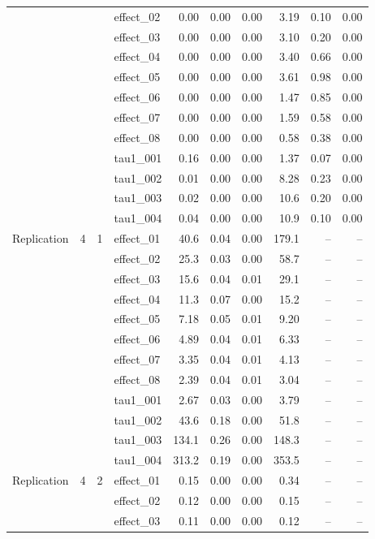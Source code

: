 {\begin{longtable}{lccl rr r r rr}
 &  &  & effect\_02 & 0.00 & 0.00 & 0.00 & 3.19 & 0.10 & 0.00\\
 &  &  & effect\_03 & 0.00 & 0.00 & 0.00 & 3.10 & 0.20 & 0.00\\
 &  &  & effect\_04 & 0.00 & 0.00 & 0.00 & 3.40 & 0.66 & 0.00\\
 &  &  & effect\_05 & 0.00 & 0.00 & 0.00 & 3.61 & 0.98 & 0.00\\
 &  &  & effect\_06 & 0.00 & 0.00 & 0.00 & 1.47 & 0.85 & 0.00\\
 &  &  & effect\_07 & 0.00 & 0.00 & 0.00 & 1.59 & 0.58 & 0.00\\
 &  &  & effect\_08 & 0.00 & 0.00 & 0.00 & 0.58 & 0.38 & 0.00\\
 &  &  & tau1\_001 & 0.16 & 0.00 & 0.00 & 1.37 & 0.07 & 0.00\\
 &  &  & tau1\_002 & 0.01 & 0.00 & 0.00 & 8.28 & 0.23 & 0.00\\
 &  &  & tau1\_003 & 0.02 & 0.00 & 0.00 & 10.6 & 0.20 & 0.00\\
 &  &  & tau1\_004 & 0.04 & 0.00 & 0.00 & 10.9 & 0.10 & 0.00\\
\midrule
Replication & 4 & 1 & effect\_01 & 40.6 & 0.04 & 0.00 & 179.1 & -- & --\\
 &  &  & effect\_02 & 25.3 & 0.03 & 0.00 & 58.7 & -- & --\\
 &  &  & effect\_03 & 15.6 & 0.04 & 0.01 & 29.1 & -- & --\\
 &  &  & effect\_04 & 11.3 & 0.07 & 0.00 & 15.2 & -- & --\\
 &  &  & effect\_05 & 7.18 & 0.05 & 0.01 & 9.20 & -- & --\\
 &  &  & effect\_06 & 4.89 & 0.04 & 0.01 & 6.33 & -- & --\\
 &  &  & effect\_07 & 3.35 & 0.04 & 0.01 & 4.13 & -- & --\\
 &  &  & effect\_08 & 2.39 & 0.04 & 0.01 & 3.04 & -- & --\\
 &  &  & tau1\_001 & 2.67 & 0.03 & 0.00 & 3.79 & -- & --\\
 &  &  & tau1\_002 & 43.6 & 0.18 & 0.00 & 51.8 & -- & --\\
 &  &  & tau1\_003 & 134.1 & 0.26 & 0.00 & 148.3 & -- & --\\
 &  &  & tau1\_004 & 313.2 & 0.19 & 0.00 & 353.5 & -- & --\\
\midrule
Replication & 4 & 2 & effect\_01 & 0.15 & 0.00 & 0.00 & 0.34 & -- & --\\
 &  &  & effect\_02 & 0.12 & 0.00 & 0.00 & 0.15 & -- & --\\
 &  &  & effect\_03 & 0.11 & 0.00 & 0.00 & 0.12 & -- & --\\

\end{longtable}}
